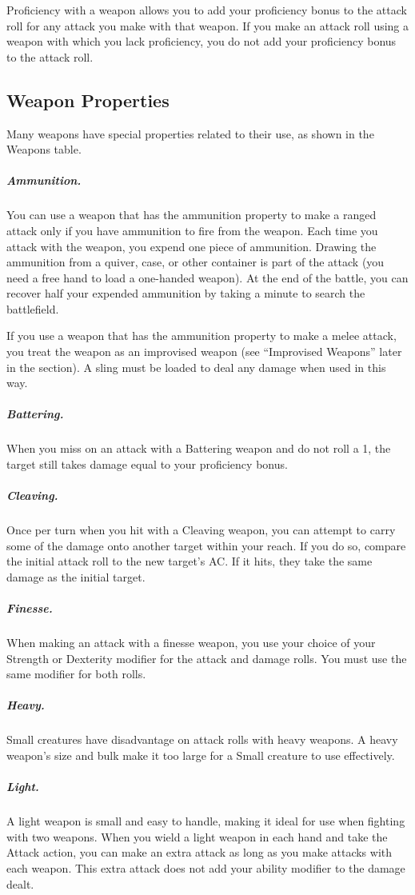 Proficiency with a weapon allows you to add your proficiency bonus to the attack roll for any attack you make with that weapon. If you make an attack roll using a weapon with which you lack proficiency, you do not add your proficiency bonus to the attack roll.

\subsection{Weapon Properties}

Many weapons have special properties related to their use, as shown in the Weapons table.

\subparagraph*{Ammunition.} You can use a weapon that has the ammunition property to make a ranged attack only if you have ammunition to fire from the weapon. Each time you attack with the weapon, you expend one piece of ammunition. Drawing the ammunition from a quiver, case, or other container is part of the attack (you need a free hand to load a one-handed weapon). At the end of the battle, you can recover half your expended ammunition by taking a minute to search the battlefield.

If you use a weapon that has the ammunition property to make a melee attack, you treat the weapon as an improvised weapon (see “Improvised Weapons” later in the section). A sling must be loaded to deal any damage when used in this way.

\subparagraph*{Battering.} When you miss on an attack with a Battering weapon and do not roll a 1, the target still takes damage equal to your proficiency bonus.

\subparagraph*{Cleaving.} Once per turn when you hit with a Cleaving weapon, you can attempt to carry some of the damage onto another target within your reach. If you do so, compare the initial attack roll to the new target's AC. If it hits, they take the same damage as the initial target.

\subparagraph*{Finesse.} When making an attack with a finesse weapon, you use your choice of your Strength or Dexterity modifier for the attack and damage rolls. You must use the same modifier for both rolls.

\subparagraph*{Heavy.} Small creatures have disadvantage on attack rolls with heavy weapons. A heavy weapon's size and bulk make it too large for a Small creature to use effectively. 

\subparagraph*{Light.} A light weapon is small and easy to handle, making it ideal for use when fighting with two weapons. When you wield a light weapon in each hand and take the Attack action, you can make an extra attack as long as you make attacks with each weapon. This extra attack does not add your ability modifier to the damage dealt.

